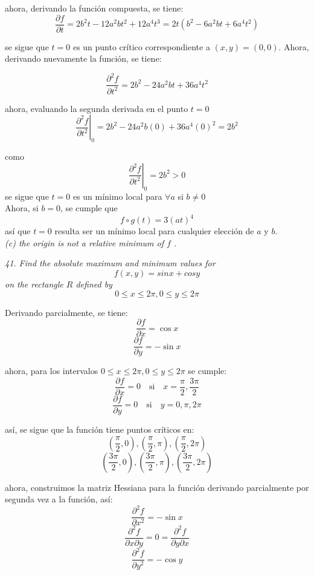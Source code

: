 \documentclass[a4paper,12pt]{article}
\begin{document}
		ahora, derivando la función compuesta, se tiene:
		$$\frac{\partial f}{\partial t} = 2b^2t -12a^2bt^2 + 12a^4t^3
										= 2t(b^2 - 6a^2bt + 6a^4t^2)$$

		se sigue que $t = 0$ es un punto crítico correspondiente a $(x,y) = (0,0)$.
		Ahora, derivando nuevamente la función, se tiene:

		$$\frac{\partial^2 f}{\partial t^2} = 2b^2 -24a^2bt + 36a^4t^2 $$

		ahora, evaluando la segunda derivada en el punto $t = 0$
		$$\left. \frac{\partial^2 f}{\partial t^2} \right|_{0}
			= 2b^2 -24a^2b(0) + 36a^4(0)^2 = 2b^2 $$

		como
			$$\left. \frac{\partial^2 f}{\partial t^2} \right|_{0} = 2b^2 > 0$$
		se sigue que $t = 0$ es un mínimo local para
		$\forall a$ si $b \neq 0$\\

		Ahora, si $b = 0$, se cumple que
			$$f \circ g (t) = 3(at)^4$$
		así que $t = 0$ resulta ser un mínimo local para cualquier elección de
		$a$ y $b$.\\

	\textit{(c) the origin is not a relative minimum of $f$ .}\\
	\newline


	\textit{41. Find the absolute maximum and minimum values for
		$$f(x, y) = sin x + cos y$$ on the rectangle $R$ defined by
		$$0 \leq x \leq 2\pi, 0 \leq y \leq 2\pi$$}

		Derivando parcialmente, se tiene:
		$$\frac{\partial f}{\partial x} = \cos x $$
		$$\frac{\partial f}{\partial y} = - \sin x $$

		ahora, para los intervalos $0 \leq x \leq 2\pi, 0 \leq y \leq 2\pi$
		se cumple:
			$$\frac{\partial f}{\partial x} = 0 \quad \text{si} \quad
				x=\frac{\pi}{2}, \frac{3\pi}{2}$$
			$$\frac{\partial f}{\partial y} = 0 \quad \text{si} \quad
				y=0, \pi, 2\pi$$

		así, se sigue que la función tiene puntos críticos en:
			$$(\frac{\pi}{2}, 0), (\frac{\pi}{2}, \pi), (\frac{\pi}{2}, 2\pi)$$
			$$(\frac{3\pi}{2}, 0), (\frac{3\pi}{2}, \pi), (\frac{3\pi}{2}, 2\pi)$$

		ahora, construimos la matriz Hessiana para la función derivando
		parcialmente por segunda vez a la función, así:
			$$ \frac{\partial^2f}{\partial x^2} = -\sin x$$
			$$ \frac{\partial^2f}{\partial x\partial y} = 0 = \frac{\partial^2f}{\partial y\partial x}$$
			$$ \frac{\partial^2f}{\partial y^2} = - \cos y$$
\end{document}
